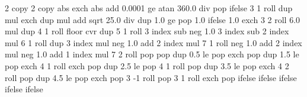 {\pgfpoint{-50bp}{-50bp}}
{\pgfpoint{50bp}{50bp}}
{}
{ %
  2 copy %
  2 copy abs exch abs add 0.0001 ge
  {atan 360.0 div} %
  { pop } %
  ifelse  %
  3 1 roll %
  dup mul %
  exch dup mul %
  add sqrt %
  25.0 div %
  dup 1.0 ge %
  { pop 1.0 }{} ifelse %
  1.0 exch %
  3 2 roll 6.0 mul dup 4 1 roll %
  floor cvr  %
  dup 5 1 roll %
  3 index sub neg %
  1.0 3 index sub %
  2 index mul %
  6 1 roll %
  dup 3 index mul neg 1.0 add %
  2 index mul %
  7 1 roll %
  neg 1.0 add %
  2 index mul neg 1.0  add %
  1 index mul %
  7 2 roll %
  pop pop %
  dup 0.5 le %
  { %
    pop exch pop
  }
  { dup 1.5 le %
    { %
      pop exch 4 1 roll exch pop
    }
    { dup 2.5 le %
      { %
        pop 4 1 roll pop
      }
      { dup 3.5 le %
        { %
          pop exch 4 2 roll pop
        }
        { dup 4.5 le %
          { %
            pop exch pop 3 -1 roll
          }
          { %
            pop 3 1 roll exch pop
          }
          ifelse
        }
        ifelse %
      }
      ifelse %
    }
    ifelse %
  }
  ifelse %
}%

